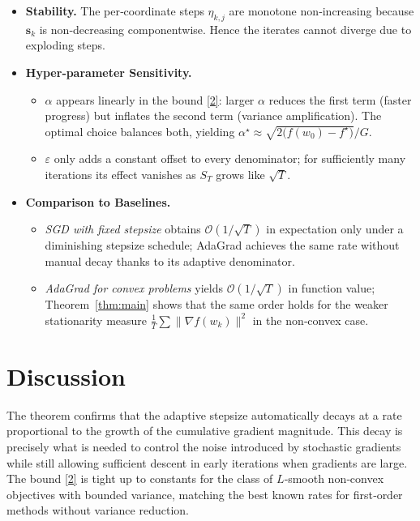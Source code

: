 \documentclass{article}
\begin{document}
\begin{itemize}[leftmargin=*]
\item \textbf{Stability.} The per‑coordinate steps \(\eta_{k,j}\) are monotone non‑increasing because $\mathbf{s}_{k}$ is non‑decreasing componentwise. Hence the iterates cannot diverge due to exploding steps.

\item \textbf{Hyper‑parameter Sensitivity.}
  \begin{itemize}
    \item \(\alpha\) appears linearly in the bound \eqref{2}: larger $\alpha$ reduces the first term (faster progress) but inflates the second term (variance amplification). The optimal choice balances both, yielding \(\alpha^{\star}\approx \sqrt{2\bigl(f(w_0)-f^{\star}\bigr)}/G\).
    \item \(\varepsilon\) only adds a constant offset to every denominator; for sufficiently many iterations its effect vanishes as $S_T$ grows like $\sqrt{T}$.
  \end{itemize}

\item \textbf{Comparison to Baselines.}
  \begin{itemize}
    \item \emph{SGD with fixed stepsize} obtains $\mathcal{O}(1/\sqrt{T})$ in expectation only under a diminishing stepsize schedule; AdaGrad achieves the same rate without manual decay thanks to its adaptive denominator.
    \item \emph{AdaGrad for convex problems} yields $\mathcal{O}(1/\sqrt{T})$ in function value; Theorem~\ref{thm:main} shows that the same order holds for the weaker stationarity measure $\frac{1}{T}\sum\|\nabla f(w_k)\|^{2}$ in the non‑convex case.
  \end{itemize}
\end{itemize}

\section*{Discussion}

The theorem confirms that the adaptive stepsize automatically decays at a rate proportional to the growth of the cumulative gradient magnitude. This decay is precisely what is needed to control the noise introduced by stochastic gradients while still allowing sufficient descent in early iterations when gradients are large. The bound \eqref{2} is tight up to constants for the class of $L$‑smooth non‑convex objectives with bounded variance, matching the best known rates for first‑order methods without variance reduction.
\end{document}
